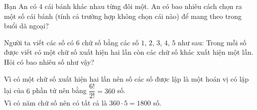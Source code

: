 \begin{bt}%
	Bạn An có $4$ cái bánh khác nhau từng đôi một. An có bao nhiêu cách chọn ra một số cái bánh (tính cả trường hợp không chọn cái nào) để mang theo trong buổi dã ngoại?
\end{bt}

\begin{bt}%
	Người ta viết các số có $6$ chữ số bằng các số $1$, $2$, $3$, $4$, $5$ như sau: Trong  mỗi số được viết có một chữ số xuất hiện hai lần còn các chữ số khác xuất hiện một lần. Hỏi có bao nhiêu số như vậy?
	\loigiai
	{
		Vì có một chữ số xuất hiện hai lần nên số các số được lập là một hoán vị có lặp lại của $6$ phần tử nên bằng $\dfrac{6!}{2!}=360$ số.\\
		Vì có năm chữ số nên có tất cả là $360\cdot5=1800$ số.
		
	}
\end{bt}

